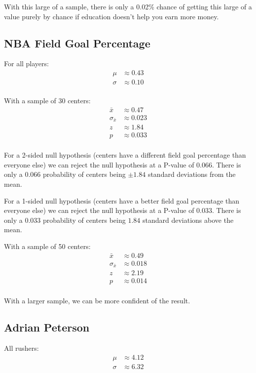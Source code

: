 \documentclass[landscape]{exam}
\begin{document}
  With this large of a sample, there is only a 0.02\% chance of getting this
  large of a value purely by chance if education doesn't help you earn more
  money.


  \subsection{NBA Field Goal Percentage}

  For all players:
  \begin{align*}
    \mu    & \approx 0.43 \\
    \sigma & \approx 0.10 \\
  \end{align*}

  With a sample of 30 centers:
  \begin{align*}
    \bar{x}          & \approx 0.47 \\
    \sigma_{\bar{x}} & \approx 0.023 \\
    z                & \approx 1.84 \\
    p                & \approx 0.033 \\
  \end{align*}

  For a 2-sided null hypothesis (centers have a different field goal percentage than
  everyone else) we can reject the null hypothesis at a P-value of 0.066. There
  is only a 0.066 probability of centers being $\pm 1.84$ standard deviations from the
  mean.

  For a 1-sided null hypothesis (centers have a better field goal percentage
  than everyone else) we can reject the null hypothesis at a P-value of 0.033.
  There is only a 0.033 probability of centers being $1.84$ standard deviations
  above the mean.

  With a sample of 50 centers:
  \begin{align*}
    \bar{x}          & \approx 0.49 \\
    \sigma_{\bar{x}} & \approx 0.018 \\
    z                & \approx 2.19 \\
    p                & \approx 0.014 \\
  \end{align*}

  With a larger sample, we can be more confident of the result.

  \subsection{Adrian Peterson}
  All rushers:
  \begin{align*}
    \mu    & \approx 4.12 \\
    \sigma & \approx 6.32 \\
  \end{align*}
\end{document}
